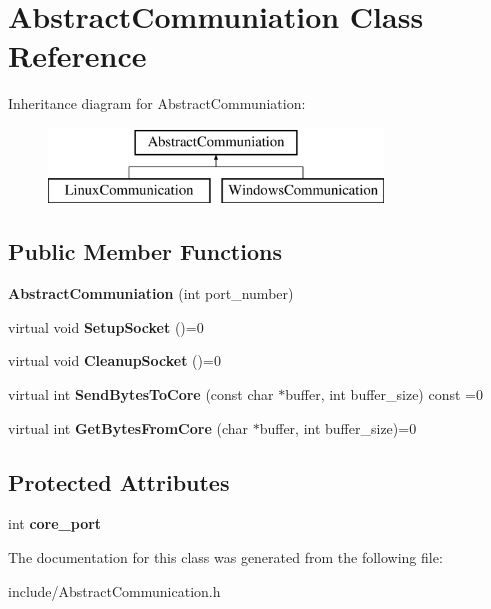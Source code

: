 \hypertarget{class_abstract_communiation}{}\section{Abstract\+Communiation Class Reference}
\label{class_abstract_communiation}
Inheritance diagram for Abstract\+Communiation\+:\begin{figure}[H]
\begin{center}
\leavevmode
\includegraphics[height=2.000000cm]{class_abstract_communiation}
\end{center}
\end{figure}
\subsection*{Public Member Functions}
\begin{DoxyCompactItemize}
\item 
\hypertarget{class_abstract_communiation_ac34543a5061fd72060be1f07154bf63f}{}\label{class_abstract_communiation_ac34543a5061fd72060be1f07154bf63f} 
{\bfseries Abstract\+Communiation} (int port\+\_\+number)
\item 
\hypertarget{class_abstract_communiation_a1b0a8e332e2a384d1cee015dabdaf6e3}{}\label{class_abstract_communiation_a1b0a8e332e2a384d1cee015dabdaf6e3} 
virtual void {\bfseries Setup\+Socket} ()=0
\item 
\hypertarget{class_abstract_communiation_a923e54025ed727117e2cfdd2b7a4d218}{}\label{class_abstract_communiation_a923e54025ed727117e2cfdd2b7a4d218} 
virtual void {\bfseries Cleanup\+Socket} ()=0
\item 
\hypertarget{class_abstract_communiation_a912ae3810fd73acd17b47dc8d17eacd6}{}\label{class_abstract_communiation_a912ae3810fd73acd17b47dc8d17eacd6} 
virtual int {\bfseries Send\+Bytes\+To\+Core} (const char $\ast$buffer, int buffer\+\_\+size) const =0
\item 
\hypertarget{class_abstract_communiation_a0ea1c0a2b2401aa136bd055eb12ab7c4}{}\label{class_abstract_communiation_a0ea1c0a2b2401aa136bd055eb12ab7c4} 
virtual int {\bfseries Get\+Bytes\+From\+Core} (char $\ast$buffer, int buffer\+\_\+size)=0
\end{DoxyCompactItemize}
\subsection*{Protected Attributes}
\begin{DoxyCompactItemize}
\item 
\hypertarget{class_abstract_communiation_ac7a6e918a8ce78c88b0db4117491d1c3}{}\label{class_abstract_communiation_ac7a6e918a8ce78c88b0db4117491d1c3} 
int {\bfseries core\+\_\+port}
\end{DoxyCompactItemize}


The documentation for this class was generated from the following file\+:\begin{DoxyCompactItemize}
\item 
include/Abstract\+Communication.\+h\end{DoxyCompactItemize}
